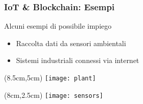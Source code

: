 \begin{frame}
 \frametitle{IoT \& Blockchain: Esempi}

 Alcuni esempi di possibile impiego
 \begin{itemize}
  \item<1-> Raccolta dati da sensori ambientali
  \item<2-> Sistemi industriali connessi via internet
 \end{itemize}
 
 
 \begin{textblock*}{5cm}(8.5cm,5cm)
  \texttt{[image: plant]}
 \end{textblock*}

 \begin{textblock*}{5cm}(8cm,2.5cm)
  \texttt{[image: sensors]}
 \end{textblock*}
\end{frame}

%
%
%
